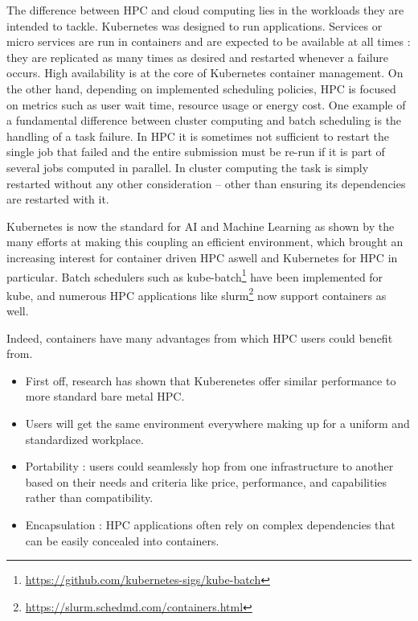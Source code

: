 The difference between HPC and cloud computing lies in the workloads they are
intended to tackle.  Kubernetes was designed to run applications. Services or
micro services are run in containers and are expected to be available at all
times : they are replicated as many times as desired and restarted whenever a
failure occurs. High availability is at the core of Kubernetes container
management.  On the other hand, depending on implemented scheduling policies,
HPC is focused on metrics such as user wait time, resource usage or energy
cost. One example of a fundamental difference between cluster computing and
batch scheduling is the handling of a task failure. In HPC it is sometimes not
sufficient to restart the single job that failed and the entire submission must
be re-run if it is part of several jobs computed in parallel. In cluster
computing the task is simply restarted without any other consideration -- other
than ensuring its dependencies are restarted with it.

Kubernetes is now the standard for AI and Machine Learning as shown by the many
efforts at making this coupling an efficient
environment\cite{lee2017design}\cite{233001}\cite{10.1145/3154842.3154845},
which brought an increasing interest for container driven HPC aswell and
Kubernetes for HPC in particular. Batch schedulers such as
kube-batch\footnote{\url{https://github.com/kubernetes-sigs/kube-batch}} have
been implemented for kube, and numerous HPC applications like
slurm\footnote{\url{https://slurm.schedmd.com/containers.html}} now support containers as well.

Indeed, containers have many advantages from which HPC users could benefit
from.
\begin{itemize}
	\item First off, research has shown that Kuberenetes offer similar
		performance to more standard bare metal HPC\cite{8950981}.
	\item Users will get the same environment everywhere making up for a
		uniform and standardized workplace.
	\item Portability : users could seamlessly hop from one infrastructure
		to another based on their needs and criteria like price,
		performance, and capabilities rather than compatibility.
	\item Encapsulation : HPC applications often rely on complex
		dependencies that can be easily concealed into containers.
\end{itemize}

